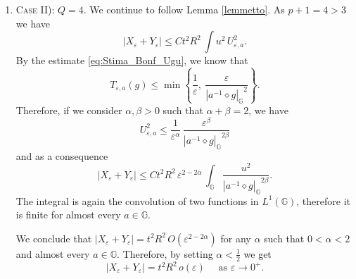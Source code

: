\documentclass[11pt]{amsart}
\numberwithin{equation}{section} %
\theoremstyle{definition}
\newcommand{\mb}{\mathbb}
\def\R{\mathbb{R}}
\def\H{\mb{H}}
\newcommand{\al}{\alpha}
\newcommand{\be}{\beta}
\def\G{\mathbb{G}}
\begin{document}
\begin{enumerate}
\item \textsc{Case II): $Q = 4$}. We continue to follow Lemma \ref{lemmetto}. As $p+1=4>3$ we have
\[
|X_\varepsilon+Y_\varepsilon|\leq Ct^2R^2\, \int u^2\, U_{\varepsilon,a}^2.
\]
By the estimate \eqref{eq:Stima_Bonf_Ugu}, we know that
\[
T_{\varepsilon,a}(g)\leq\min\left\{\frac{1}{\varepsilon},\ \frac{\varepsilon}{{|a^{-1}\diamond g|_{\mathbb{G}}}^2}\right\}.
\]
Therefore, if we consider $\al,\be>0$ such that $\al+\be=2$,
we have 
\[
U_{\varepsilon,a}^2\leq \frac{1}{\varepsilon^{\al}}\, \frac{\varepsilon^\be}{{|a^{-1}\diamond g|_{\mathbb{G}}}^{2\be}}
\]
and as a consequence
\[
|X_\varepsilon+Y_\varepsilon|\leq Ct^2R^2\, \varepsilon^{2-2\al}\, \int_\G\frac{u^2}{{|a^{-1}\diamond g|_{\mathbb{G}}}^{2\beta}}.
\]
The integral is again
the convolution of two functions in $L^1(\G)$, therefore
it is finite for almost every $a\in \G$.

We conclude that $|X_\varepsilon+Y_\varepsilon|=t^2R^2\, O(\varepsilon^{2-2\al})$ for any $\al$ such that  $0<\al<2$ 
and almost every $a\in \G$. 
Therefore, by setting $\al<\frac{1}{2}$ we get 
\[
|X_\varepsilon+Y_\varepsilon|=t^2R^2\, o(\varepsilon) \quad \textrm{ as } \varepsilon \to 0^{+}.
\]
\end{enumerate}
\end{document}
